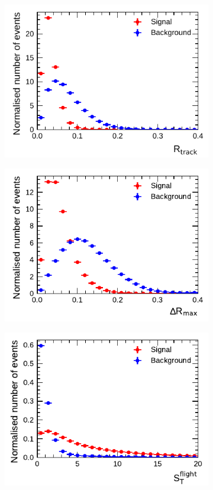 \begin{figure}[htbp]
  \begin{subfigure}{0.5\textwidth}
    \centering
    \includegraphics{./figures/baseline_bdt_vars/3p/innerTrkAvgDist_fixed.pdf}
  \end{subfigure}%
  \begin{subfigure}{0.5\textwidth}
    \centering
    \includegraphics{./figures/baseline_bdt_vars/3p/dRmax.pdf}
  \end{subfigure}
  \begin{subfigure}{0.5\textwidth}
    \centering
    \includegraphics{./figures/baseline_bdt_vars/3p/trFlightPathSig.pdf}

\end{subfigure}
\end{figure}
